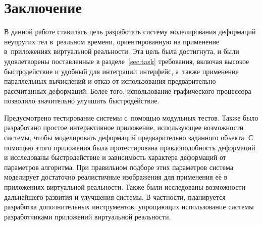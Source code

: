 \documentclass[a4paper, 14pt, titlepage]{extarticle}
\let\oldsection\section
\renewcommand{\section}{\newpage\oldsection}
\begin{document}
  \section{Заключение}\label{sec:conclusion}

    В данной работе ставилась цель разработать систему моделирования деформаций неупругих тел
    в~реальном времени, ориентированную на применение в~приложениях виртуальной реальности. Эта цель
    была достигнута, и были удовлетворены поставленные в разделе~\ref{sec:task} требования, включая
    высокое быстродействие и удобный для интеграции интерфейс, а~также применение параллельных
    вычислений и отказ от использования предварительно рассчитанных деформаций. Более того,
    использование графического процессора позволило значительно улучшить быстродействие.

    Предусмотрено тестирование системы с~помощью модульных тестов. Также было разработано простое интерактивное
    приложение, использующее возможности системы, чтобы моделировать деформаций предварительно
    заданного объекта. С помощью этого приложения была протестирована правдоподобность деформаций и
    исследованы быстродействие и зависимость характера деформаций от параметров алгоритма.
    При правильном подборе этих параметров система моделирует достаточно реалистичные изображения
    для применения её в приложениях виртуальной реальности.
    Также были исследованы возможности дальнейшего развития и улучшения системы. В частности, планируется разработка
    дополнительных инструментов, упрощающих использование системы разработчиками приложений
    виртуальной реальности.

  \begin{flushleft}
    
  \end{flushleft}
\end{document}
